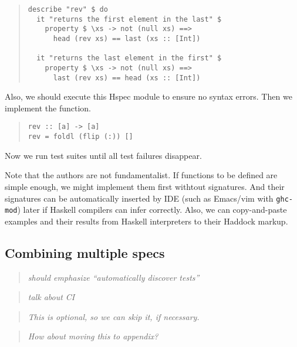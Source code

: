 \documentclass[preprint]{sigplanconf}
\newcommand{\hspec}{Hspec}
\begin{document}
\begin{quote}
\small
\begin{verbatim}
describe "rev" $ do
  it "returns the first element in the last" $
    property $ \xs -> not (null xs) ==>
      head (rev xs) == last (xs :: [Int])

  it "returns the last element in the first" $
    property $ \xs -> not (null xs) ==>
      last (rev xs) == head (xs :: [Int])
\end{verbatim}
\end{quote}

\noindent Also, we should execute this \hspec{} module
to ensure no syntax errors.
Then we implement the function.

\begin{quote}
\small
\begin{verbatim}
rev :: [a] -> [a]
rev = foldl (flip (:)) []
\end{verbatim}
\end{quote}

\noindent Now we run test suites until
all test failures disappear.

Note that the authors are not fundamentalist.
If functions to be defined are simple enough,
we might implement them first withtout signatures.
And their signatures can be automatically
inserted by IDE (such as Emacs/vim with {\tt ghc-mod}) later
if Haskell compilers can infer correctly.
Also, we can copy-and-paste examples and their results
from Haskell interpreters to their Haddock markup.

\subsection{Combining multiple specs}

\begin{quote}
    \emph{should emphasize ``automatically discover tests''}
\end{quote}

\begin{quote}
    \emph{talk about CI}
\end{quote}

\begin{quote}
\emph{This is optional, so we can skip it, if necessary.}
\end{quote}

\begin{quote}
\emph{How about moving this to appendix?}
\end{quote}
\end{document}
